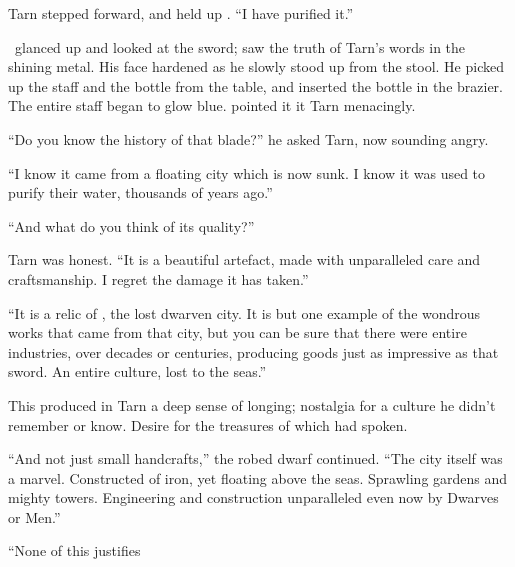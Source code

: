Tarn stepped forward, and held up \kildir.  ``I have purified it.''

\mothzam\ glanced up and looked at the sword; saw the truth of Tarn's words in the shining metal.  His face hardened as he slowly stood up from the stool.  He picked up the staff and the bottle from the table, and inserted the bottle in the brazier.  The entire staff began to glow blue.  \mothzam pointed it it Tarn menacingly.

``Do you know the history of that blade?'' he asked Tarn, now sounding angry.

``I know it came from a floating city which is now sunk.  I know it was used to purify their water, thousands of years ago.''

``And what do you think of its quality?''

Tarn was honest.  ``It is a beautiful artefact, made with unparalleled care and craftsmanship.  I regret the damage it has taken.''

``It is a relic of \valdunmir, the lost dwarven city.  It is but one example of the wondrous works that came from that city, but you can be sure that there were entire industries, over decades or centuries, producing goods just as impressive as that sword.  An entire culture, lost to the seas.''

This produced in Tarn a deep sense of longing; nostalgia for a culture he didn't remember or know.  Desire for the treasures of which \mothzam had spoken.

``And not just small handcrafts,'' the robed dwarf continued. ``The city itself was a marvel.  Constructed of iron, yet floating above the seas.  Sprawling gardens and mighty towers.  Engineering and construction unparalleled even now by Dwarves or Men.''

``None of this justifies 

